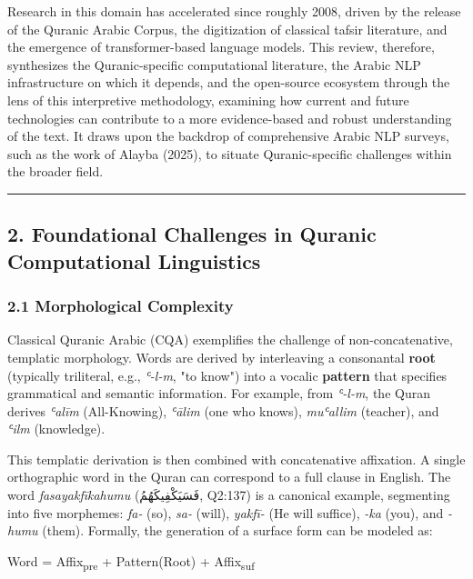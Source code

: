 \documentclass[12pt,a4paper]{article}
\begin{document}
Research in this domain has accelerated since roughly 2008, driven by
the release of the Quranic Arabic Corpus, the digitization of classical
tafsir literature, and the emergence of transformer-based language
models. This review, therefore, synthesizes the Quranic-specific
computational literature, the Arabic NLP infrastructure on which it
depends, and the open-source ecosystem through the lens of this
interpretive methodology, examining how current and future technologies
can contribute to a more evidence-based and robust understanding of the
text. It draws upon the backdrop of comprehensive Arabic NLP surveys,
such as the work of Alayba (2025), to situate Quranic-specific
challenges within the broader field.

\begin{center}\rule{0.5\linewidth}{0.5pt}\end{center}

\protect{}\label{s2}
\subsection{2. Foundational Challenges in Quranic Computational
Linguistics}\label{foundational-challenges-in-quranic-computational-linguistics}

\subsubsection{2.1 Morphological Complexity}\label{s2-1}

Classical Quranic Arabic (CQA) exemplifies the challenge of
non-concatenative, templatic morphology. Words are derived by
interleaving a consonantal \textbf{root} (typically triliteral, e.g.,
\emph{ʿ-l-m}, "to know") into a vocalic \textbf{pattern} that specifies
grammatical and semantic information. For example, from \emph{ʿ-l-m},
the Quran derives \emph{ʿalīm} (All-Knowing), \emph{ʿālim} (one who
knows), \emph{muʿallim} (teacher), and \emph{ʿilm} (knowledge).

This templatic derivation is then combined with concatenative
affixation. A single orthographic word in the Quran can correspond to a
full clause in English. The word \emph{fasayakfīkahumu} (فَسَيَكْفِيكَهُمُ,
Q2:137) is a canonical example, segmenting into five morphemes:
\emph{fa-} (so), \emph{sa-} (will), \emph{yakfī-} (He will suffice),
\emph{-ka} (you), and \emph{-humu} (them). Formally, the generation of a
surface form can be modeled as:

Word = Affix\textsubscript{pre} + Pattern(Root) +
Affix\textsubscript{suf}
\end{document}
